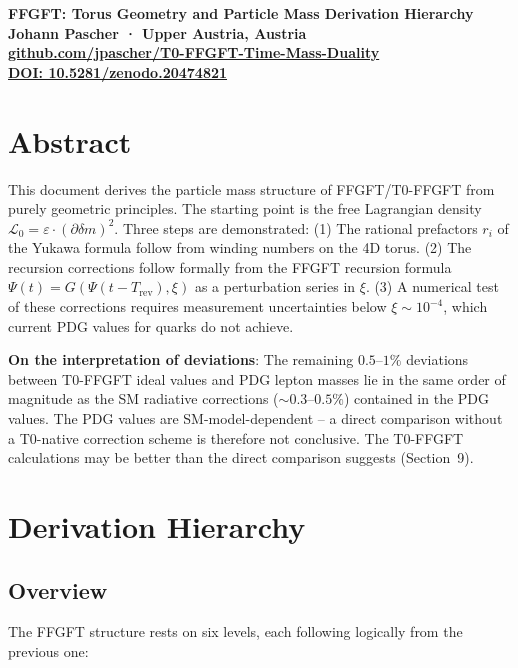 {\centering
\Large\bfseries\color{T0blue}
FFGFT: Torus Geometry and Particle Mass Derivation Hierarchy\\[0.4em]
\normalsize\color{T0gray}
Johann Pascher · Upper Austria, Austria\\
\href{https://github.com/jpascher/T0-FFGFT-Time-Mass-Duality}{github.com/jpascher/T0-FFGFT-Time-Mass-Duality}\\
\href{https://zenodo.org/records/20474821}{DOI: 10.5281/zenodo.20474821}\\[0.8em]
}
\thispagestyle{firstpage}

\section*{Abstract}
This document derives the particle mass structure of FFGFT/T0-FFGFT
from purely geometric principles. The starting point is the free
Lagrangian density $\mathcal{L}_0 = \varepsilon \cdot (\partial\delta m)^2$.
Three steps are demonstrated: (1) The rational prefactors $r_i$ of the
Yukawa formula follow from winding numbers on the 4D torus. (2) The
recursion corrections follow formally from the FFGFT recursion formula
$\Psi(t) = G(\Psi(t-T_{\mathrm{rev}}), \xi)$ as a perturbation series in $\xi$.
(3) A numerical test of these corrections requires measurement uncertainties
below $\xi \sim 10^{-4}$, which current PDG values for quarks do not achieve.

\textbf{On the interpretation of deviations}: The remaining $0.5$--$1\%$
deviations between T0-FFGFT ideal values and PDG lepton masses lie in
the same order of magnitude as the SM radiative corrections ($\sim 0.3$--$0.5\%$)
contained in the PDG values. The PDG values are SM-model-dependent -- a
direct comparison without a T0-native correction scheme is therefore
not conclusive. The T0-FFGFT calculations may be better than the direct
comparison suggests (Section~9).

\tableofcontents
\newpage

\section{Derivation Hierarchy}

\subsection{Overview}

The FFGFT structure rests on six levels, each following logically
from the previous one:

